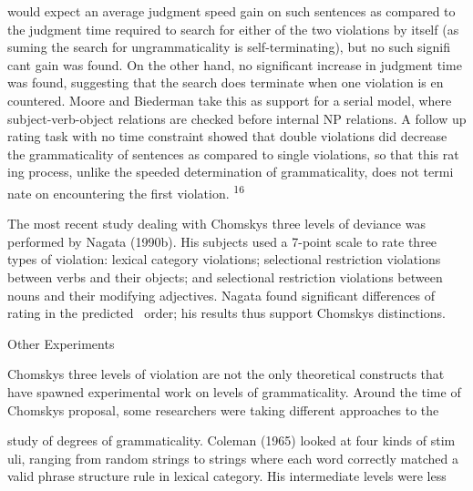 \begin{styleStandard}
would expect an average judgment speed gain on such sentences as compared to the judgment time required to search for either of the two violations by itself (as\- suming the search for ungrammaticality is self-terminating), but no such signifi\- cant gain was found. On the other hand, no significant increase in judgment time was found, suggesting that the search does terminate when one violation is en\- countered. Moore and Biederman take this as support for a serial model, where subject-verb-object relations are checked before internal NP relations. A follow\- up rating task with no time constraint showed that double violations did decrease the grammaticality of sentences as compared to single violations, so that this rat\- ing process, unlike the speeded determination of grammaticality, does not termi\- nate on encountering the first violation. \textsuperscript{16}
\end{styleStandard}


\begin{styleStandard}
The most recent study dealing with Chomsky{\textquotesingle}s three levels of deviance was performed by Nagata (1990b). His subjects used a 7-point scale to rate three types of violation: lexical category violations; selectional restriction violations between verbs and their objects; and selectional restriction violations between nouns and their modifying adjectives. Nagata found significant differences of rating in the predicted \ order; his results thus support Chomsky{\textquotesingle}s distinctions.
\end{styleStandard}


\begin{styleHeadingviii}
Other Experiments
\end{styleHeadingviii}


\begin{styleStandard}
Chomsky{\textquotesingle}s three levels of violation are not the only theoretical constructs that have spawned experimental work on levels of grammaticality. Around the time of Chomsky{\textquotesingle}s proposal, some researchers were taking different approaches to the
\end{styleStandard}


\begin{styleStandard}
study of degrees of grammaticality. Coleman (1965) looked at four kinds of stim\- uli, ranging from random strings to strings where each word correctly matched a valid phrase structure rule in lexical category. His intermediate levels were less
\end{styleStandard}


